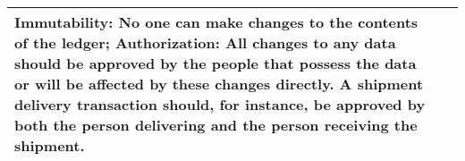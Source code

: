 \begin{table}[htpb]
\begin{tabular}{|p{3cm}|p{12cm}|}
\textbf{Immutability}: No one can make changes to the contents of the ledger;\newline
\textbf{Authorization}: All changes to any data should be approved by the people that possess the data or will be affected by these changes directly. A shipment delivery transaction should, for instance, be approved by both the person delivering and the person receiving the shipment. \\
\hline
\end{tabular}
\end{table}